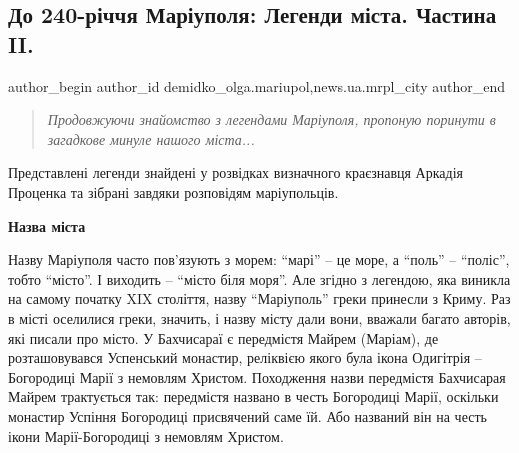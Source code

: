  
 
 
 
 
 
\subsection{До 240-річчя Маріуполя: Легенди міста. Частина II.}
\label{sec:19_09_2018.stz.news.ua.mrpl_city.1.240_rokiv_legendy_mista_2}
 
\ifcmt
 author_begin
   author_id demidko_olga.mariupol,news.ua.mrpl_city
 author_end
\fi


\begin{quote}
\em Продовжуючи знайомство з легендами Маріуполя, пропоную поринути в загадкове минуле нашого міста...	
\end{quote}

Представлені легенди знайдені у розвідках визначного краєзнавця Аркадія
Проценка та зібрані завдяки розповідям маріупольців.

\begin{center}
\textbf{Назва міста}
\end{center}

Назву Маріуполя часто пов'язують з морем: \enquote{марі} – це море, а \enquote{поль} – \enquote{поліс},
тобто \enquote{місто}. І виходить – \enquote{місто біля моря}. Але згідно з легендою, яка
виникла на самому початку XIX століття, назву \enquote{Маріуполь} греки принесли з
Криму. Раз в місті оселилися греки, значить, і назву місту дали вони, вважали
багато авторів, які писали про місто. У Бахчисараї є передмістя Майрем
(Маріам), де розташовувався Успенський монастир, реліквією якого була ікона
Одигітрія – Богородиці Марії з немовлям Христом. Походження назви передмістя
Бахчисарая Майрем трактується так: передмістя названо в честь Богородиці Марії,
оскільки монастир Успіння Богородиці присвячений саме їй. Або названий він на
честь ікони Марії-Богородиці з немовлям Христом.


